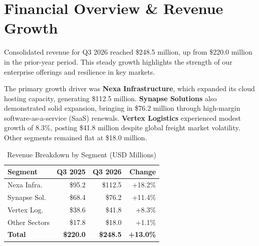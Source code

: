 \section{Financial Overview \& Revenue Growth}
Consolidated revenue for Q3 2026 reached \$248.5 million, up from \$220.0 million in the prior-year period. This steady growth highlights the strength of our enterprise offerings and resilience in key markets.
\par
The primary growth driver was \textbf{Nexa Infrastructure}, which expanded its cloud hosting capacity, generating \$112.5 million. \textbf{Synapse Solutions} also demonstrated solid expansion, bringing in \$76.2 million through high-margin software-as-a-service (SaaS) renewals. \textbf{Vertex Logistics} experienced modest growth of 8.3\%, posting \$41.8 million despite global freight market volatility. Other segments remained flat at \$18.0 million.

\begin{table}[H]
\centering
\caption{Revenue Breakdown by Segment (USD Millions)}
\label{tab:revenue}
\vspace{4pt}
\begin{tabularx}{\linewidth}{X r r r}
\rowcolor{PrimaryBlue}
\textbf{\color{white}Segment} & \textbf{\color{white}Q3 2025} & \textbf{\color{white}Q3 2026} & \textbf{\color{white}Change} \\
\midrule
Nexa Infra. & \$95.2 & \$112.5 & +18.2\% \\
\rowcolor{LightBG}
Synapse Sol. & \$68.4 & \$76.2 & +11.4\% \\
Vertex Log. & \$38.6 & \$41.8 & +8.3\% \\
\rowcolor{LightBG}
Other Sectors & \$17.8 & \$18.0 & +1.1\% \\
\midrule
\textbf{Total} & \textbf{\$220.0} & \textbf{\$248.5} & \textbf{+13.0\%} \\
\bottomrule
\end{tabularx}
\end{table}
